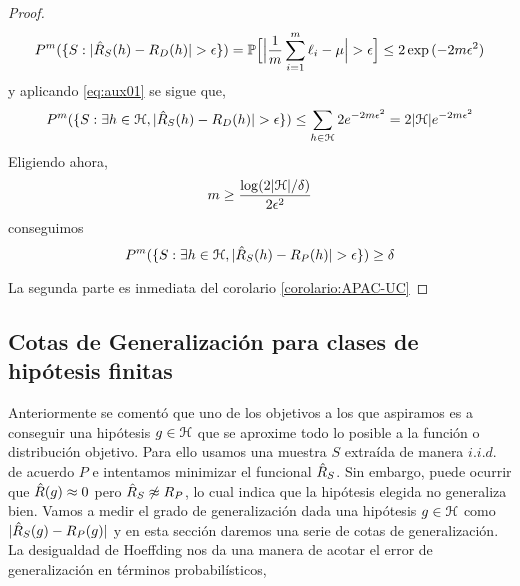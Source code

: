 \begin{proof}
        \begin{equation} \label{eq:Hoeffding_error}
            P^m(\{S: |\hat{R}_S(h) - R_D(h)| > \epsilon\}) = \mathbb{P} \Big[ \Big| \frac{1}{m} \sum_{i=1}^m \ell_i - \mu \Big| > \epsilon \Big] \leq 2 \exp{(-2m\epsilon^2)}
        \end{equation}
    \noindent y aplicando \eqref{eq:aux01} se sigue que,
        \begin{equation}
            P^m(\{ S: \exists h \in \mathcal{H}, |\hat{R}_S(h) - R_D(h)| > \epsilon \}) \leq \sum_{h\in \mathcal{H}} 2 e^{-2m\epsilon^2} = 2 |\mathcal{H}| e^{-2m\epsilon^2}
        \end{equation}
    \noindent Eligiendo ahora,
        \begin{equation}
            m \geq \frac{\log(2 |\mathcal{H}|/\delta)}{2\epsilon^2}
        \end{equation}
    \noindent conseguimos
        \begin{equation}
             P^m(\{ S: \exists h \in \mathcal{H}, |\hat{R}_S(h) - R_P(h) | >  \epsilon \}) \geq \delta
        \end{equation}
        
        
    \noindent La segunda parte es inmediata del corolario \ref{corolario:APAC-UC}
    \end{proof}



\subsection{Cotas de Generalización para clases de hipótesis finitas}

Anteriormente se comentó que uno de los objetivos a los que aspiramos es a conseguir una hipótesis $g\in \mathcal{H}$ que se aproxime todo lo posible a la función o distribución objetivo. Para ello usamos una muestra $S$ extraída de manera $i.i.d.$ de acuerdo $P$ e intentamos minimizar el funcional $\hat{R}_S$. Sin embargo, puede ocurrir que $\hat{R}(g) \approx 0$ pero $\hat{R}_S \not\approx R_P$, lo cual indica que la hipótesis elegida no generaliza bien. Vamos a medir el grado de generalización dada una hipótesis $g \in \mathcal{H}$ como $|\hat{R}_S(g) - R_P(g)|$ y en esta sección daremos una serie de cotas de generalización. \\
    
    
    La desigualdad de Hoeffding nos da una manera de acotar el error de generalización en términos probabilísticos,
    
